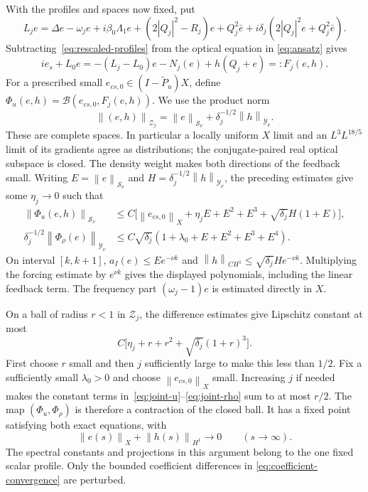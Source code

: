 \documentclass[11pt]{article}
\numberwithin{equation}{section}
\theoremstyle{remark}
\newcommand{\norm}[1]{\left\|#1\right\|}
\newcommand{\Lam}[1]{\Lambda_{#1}}
\newcommand{\Pt}[1]{\widetilde P_{#1}}
\begin{document}
With the profiles and spaces now fixed, put
\[
 L_je=\Delta e-\omega_je+i\beta_0\Lam1 e
 +(2|Q_j|^2-R_j)e+Q_j^2\bar e
       +i\delta_j(2|Q_j|^2e+Q_j^2\bar e).
\]
Subtracting~\eqref{eq:rescaled-profiles} from the optical equation in
\eqref{eq:ansatz} gives
\begin{equation}\label{eq:e-equation}
 ie_s+L_0e=-(L_j-L_0)e-N_j(e)+h(Q_j+e)=:F_j(e,h).
\end{equation}
For a prescribed small $e_{cs,0}\in(I-\Pt u)X$, define
$\Phi_u(e,h)=\mathcal B(e_{cs,0},F_j(e,h))$.
We use the product norm
\[
 \norm{(e,h)}_{\mathcal Z_j}
       =\norm e_{\mathcal S_\nu}
                    +\delta_j^{-1/2}\norm h_{\mathcal Y_\nu}.
\]
These are complete spaces. In particular a locally uniform $X$ limit
and an $L^3L^{18/5}$ limit of its gradients agree as distributions;
the conjugate-paired real optical subspace is closed.
The density weight makes both directions of the feedback small.
Writing $E=\norm e_{\mathcal S_\nu}$ and
$H=\delta_j^{-1/2}\norm h_{\mathcal Y_\nu}$, the preceding estimates give
some $\eta_j\to0$ such that
\begin{align}
 \norm{\Phi_u(e,h)}_{\mathcal S_\nu}
 &\le C\bigl[\norm{e_{cs,0}}_X+\eta_jE+E^2+E^3
                         +\sqrt{\delta_j}H(1+E)\bigr],\label{eq:joint-u}\\
 \delta_j^{-1/2}\norm{\Phi_\rho(e)}_{\mathcal Y_\nu}
 &\le C\sqrt{\delta_j}(1+\lambda_0+E+E^2+E^3+E^4).
 \label{eq:joint-rho}
\end{align}
On interval $[k,k+1]$, $a_I(e)\le Ee^{-\nu k}$ and
$\norm h_{CH^1}\le\sqrt{\delta_j}He^{-\nu k}$.
Multiplying the forcing estimate by $e^{\nu k}$ gives the displayed
polynomials, including the linear feedback term. The frequency part
$(\omega_j-1)e$ is estimated directly in $X$.

On a ball of radius $r<1$ in $\mathcal Z_j$, the difference estimates
give Lipschitz constant at most
\[
 C\bigl[\eta_j+r+r^2+\sqrt{\delta_j}(1+r)^3\bigr].
\]
First choose $r$ small and then $j$ sufficiently large to make this less
than $1/2$. Fix a sufficiently small $\lambda_0>0$ and choose
$\norm{e_{cs,0}}_X$ small. Increasing $j$ if needed makes the constant
terms in~\eqref{eq:joint-u}--\eqref{eq:joint-rho} sum to at most $r/2$.
The map $(\Phi_u,\Phi_\rho)$ is therefore a contraction of the closed ball.
It has a fixed point satisfying both exact equations, with
\begin{equation}\label{eq:decay-perturbation}
 \norm{e(s)}_X+\norm{h(s)}_{H^1}\longrightarrow0
                       \qquad(s\to\infty).
\end{equation}
The spectral constants and projections in this argument belong to the one
fixed scalar profile. Only the bounded coefficient differences in
\eqref{eq:coefficient-convergence} are perturbed.
\end{document}
